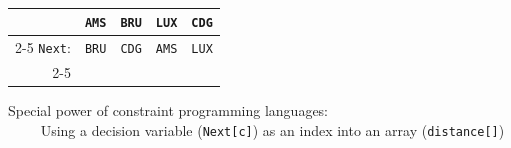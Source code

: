 \documentclass{cons-beamer}
\begin{document}
\begin{flashcardcpmpy}
\begin{frame}
  \begin{example}
    \begin{minipage}[c]{0.55\textwidth}
      
    \end{minipage}
    \begin{minipage}[c]{0.3\textwidth}
       \\~\\~\\
      \begin{tabular}{r|c|c|c|c|}
        \multicolumn{1}{r}{}
        & \multicolumn{1}{c}{\texttt{AMS}} & \multicolumn{1}{c}{\texttt{BRU}}
        & \multicolumn{1}{c}{\texttt{LUX}} & \multicolumn{1}{c}{\texttt{CDG}} \\
        \cline{2-5}
        \texttt{Next}:
        & \texttt{{BRU}} & \texttt{{CDG}}
        & \texttt{{AMS}} & \texttt{{LUX}} \\
        \cline{2-5}
      \end{tabular}
    \end{minipage}
  \end{example} \vfill
	\textcolor{Melon}{Special power} of constraint programming languages: \\
	~~~~ Using a decision variable (\texttt{Next[c]}) as an index into an array (\texttt{distance[]})
\end{frame}
\end{flashcardcpmpy}
\end{document}
